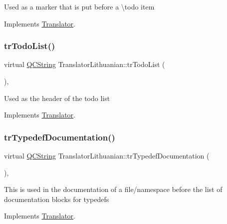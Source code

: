 Used as a marker that is put before a \textbackslash{}todo item 

Implements \mbox{\hyperlink{class_translator}{Translator}}.

\mbox{\label{class_translator_lithuanian_ac5c72a47dc3225f95398fc2ae1142d5c}} 
\subsubsection{\texorpdfstring{trTodoList()}{trTodoList()}}
{\footnotesize\ttfamily virtual \mbox{\hyperlink{class_q_c_string}{Q\+C\+String}} Translator\+Lithuanian\+::tr\+Todo\+List (\begin{DoxyParamCaption}{ }\end{DoxyParamCaption})\hspace{0.3cm}{\ttfamily [inline]}, {\ttfamily [virtual]}}

Used as the header of the todo list 

Implements \mbox{\hyperlink{class_translator}{Translator}}.

\mbox{\label{class_translator_lithuanian_a117de002d92add8d4bc9461ab8219f98}} 
\subsubsection{\texorpdfstring{trTypedefDocumentation()}{trTypedefDocumentation()}}
{\footnotesize\ttfamily virtual \mbox{\hyperlink{class_q_c_string}{Q\+C\+String}} Translator\+Lithuanian\+::tr\+Typedef\+Documentation (\begin{DoxyParamCaption}{ }\end{DoxyParamCaption})\hspace{0.3cm}{\ttfamily [inline]}, {\ttfamily [virtual]}}

This is used in the documentation of a file/namespace before the list of documentation blocks for typedefs 

Implements \mbox{\hyperlink{class_translator}{Translator}}.

\mbox{\label{class_translator_lithuanian_ae3b378a15f66eca68cbdb4f6cef542ad}} 
